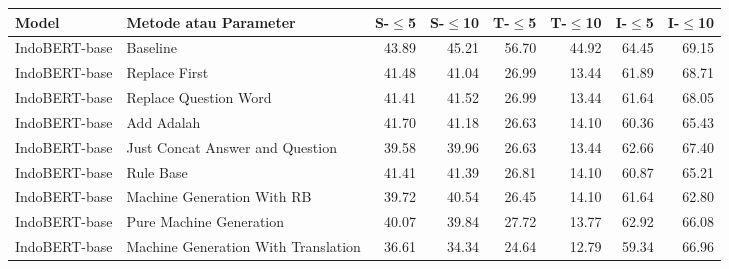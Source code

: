 \begin{table}[H]\centering
\scriptsize
\begin{tabular}{llrrrrrr}
\toprule
         Model &                Metode atau Parameter &  S-$\leq$5 &  S-$\leq$10 &  T-$\leq$5 &  T-$\leq$10 &  I-$\leq$5 &  I-$\leq$10 \\
\midrule
 IndoBERT-base &                            Baseline &                   43.89 &                    45.21 &                   56.70 &                    44.92 &                   64.45 &                    69.15 \\
 IndoBERT-base &                       Replace First &                   41.48 &                    41.04 &                   26.99 &                    13.44 &                   61.89 &                    68.71 \\
 IndoBERT-base &               Replace Question Word &                   41.41 &                    41.52 &                   26.99 &                    13.44 &                   61.64 &                    68.05 \\
 IndoBERT-base &                          Add Adalah &                   41.70 &                    41.18 &                   26.63 &                    14.10 &                   60.36 &                    65.43 \\
 IndoBERT-base &     Just Concat Answer and Question &                   39.58 &                    39.96 &                   26.63 &                    13.44 &                   62.66 &                    67.40 \\
 IndoBERT-base &                           Rule Base &                   41.41 &                    41.39 &                   26.81 &                    14.10 &                   60.87 &                    65.21 \\
 IndoBERT-base &          Machine Generation With RB &                   39.72 &                    40.54 &                   26.45 &                    14.10 &                   61.64 &                    62.80 \\
 IndoBERT-base &             Pure Machine Generation &                   40.07 &                    39.84 &                   27.72 &                    13.77 &                   62.92 &                    66.08 \\
 IndoBERT-base & Machine Generation With Translation &                   36.61 &                    34.34 &                   24.64 &                    12.79 &                   59.34 &                    66.96 \\

\end{tabular}
\end{table}
